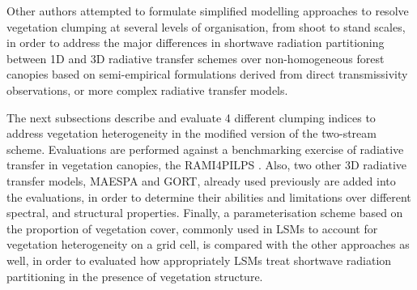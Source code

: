 \documentclass[a4paper,11pt]{report}
\begin{document}


Other authors \citep{Kucharik1999,Ni-Meister2010} attempted to formulate simplified modelling approaches to resolve vegetation clumping at several levels of organisation, from shoot to stand scales, in order to address the major differences in shortwave radiation partitioning between 1D and 3D radiative transfer schemes over non-homogeneous forest canopies based on semi-empirical formulations derived from direct transmissivity observations, or more complex radiative transfer models.

The next subsections describe and evaluate 4 different clumping indices to address vegetation heterogeneity in the modified version of the two-stream scheme. Evaluations are performed against a benchmarking exercise of radiative transfer in vegetation canopies, the RAMI4PILPS \citep{Widlowski2011}. Also, two other 3D radiative transfer models, MAESPA and GORT, already used previously are added into the evaluations, in order to determine their abilities and limitations over different spectral, and structural properties. Finally, a parameterisation scheme based on the proportion of vegetation cover, commonly used in LSMs to account for vegetation heterogeneity on a grid cell, is compared with the other approaches as well, in order to evaluated how appropriately LSMs treat shortwave radiation partitioning in the presence of vegetation structure.
\end{document}
